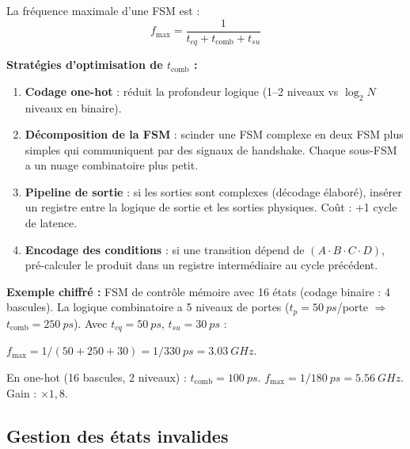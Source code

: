 \documentclass[12pt,a4paper,twoside]{book}
\begin{document}
\begin{formule}
La fréquence maximale d'une FSM est :
\[
f_{\max} = \frac{1}{t_{cq} + t_{\text{comb}} + t_{su}}
\]

\textbf{Stratégies d'optimisation de $t_{\text{comb}}$ :}
\begin{enumerate}[nosep]
\item \textbf{Codage one-hot} : réduit la profondeur logique (1--2 niveaux vs $\log_2 N$ niveaux en binaire).
\item \textbf{Décomposition de la FSM} : scinder une FSM complexe en deux FSM plus simples qui communiquent par des signaux de handshake. Chaque sous-FSM a un nuage combinatoire plus petit.
\item \textbf{Pipeline de sortie} : si les sorties sont complexes (décodage élaboré), insérer un registre entre la logique de sortie et les sorties physiques. Coût : +1 cycle de latence.
\item \textbf{Encodage des conditions} : si une transition dépend de $(A \cdot B \cdot C \cdot D)$, pré-calculer le produit dans un registre intermédiaire au cycle précédent.
\end{enumerate}
\end{formule}

\begin{pratique}
\textbf{Exemple chiffré :} FSM de contrôle mémoire avec 16 états (codage binaire : 4 bascules). La logique combinatoire a 5 niveaux de portes ($t_p = \SI{50}{ps}$/porte $\Rightarrow$ $t_{\text{comb}} = \SI{250}{ps}$). Avec $t_{cq} = \SI{50}{ps}$, $t_{su} = \SI{30}{ps}$ :

$f_{\max} = 1/(50+250+30) = 1/\SI{330}{ps} = \SI{3.03}{GHz}$.

En one-hot (16 bascules, 2 niveaux) : $t_{\text{comb}} = \SI{100}{ps}$. $f_{\max} = 1/\SI{180}{ps} = \SI{5.56}{GHz}$. Gain : $\times 1{,}8$.
\end{pratique}

\subsection{Gestion des états invalides}
\end{document}
